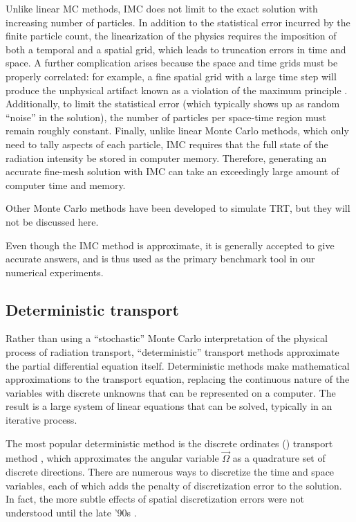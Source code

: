 Unlike linear MC methods, IMC does not limit to the exact solution with
increasing number of particles. In addition to the statistical error incurred
by the finite particle count, the linearization of the physics requires
the imposition of both a temporal and a spatial grid, which leads to
truncation errors in time and space. A further complication 
arises because the space and time grids must be properly correlated: for
example, a fine spatial grid with a large time step will produce the unphysical
artifact known as a violation of the maximum principle \cite{Lar1987}.
Additionally, to limit the statistical error (which typically shows up as
random ``noise'' in the solution), the number of particles per
space-time region must remain roughly constant. Finally, unlike linear Monte
Carlo methods, which only need to tally aspects of each particle, IMC requires
that the full state of the radiation intensity be stored in computer memory.
Therefore, generating an accurate fine-mesh solution with IMC can take an
exceedingly large
amount of computer time and memory.

Other Monte Carlo methods \cite{Bro1989,NKa1991,Cha2007a,
Den2004}
have been developed to simulate TRT, but they will not be discussed here.

Even though the IMC method is approximate, it is generally accepted to give
accurate answers, and is thus used as the primary benchmark tool in
our numerical experiments. 

\subsection{Deterministic transport}
Rather than using a ``stochastic'' Monte Carlo interpretation of the physical
process of radiation transport, ``deterministic'' transport methods
approximate the partial differential equation
itself. Deterministic methods make mathematical approximations to the transport
equation, replacing the continuous nature of the variables with discrete
unknowns that can be represented on a computer. The result is a large system of
linear equations that can be solved, typically in an iterative process.

The most popular deterministic method is the discrete ordinates (\SN)
transport method \cite{Lar2010}, which approximates the angular variable
$\vec{\Omega}$ as a quadrature set of discrete directions. There are numerous
ways to discretize the time and space variables, each of which adds the penalty
of discretization error to the solution. In fact, the more subtle effects of
spatial discretization errors were not understood until the late '90s
\cite{Ada1998,Ada2001}.

